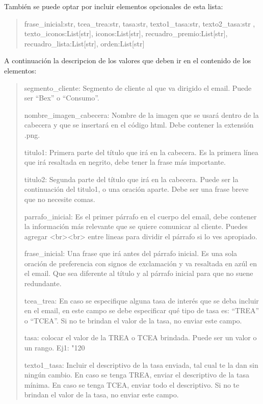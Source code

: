     También se puede optar por incluir elementos opcionales de esta lista:
        \begin{quote} 
        frase\_inicial:str, tcea\_trea:str, tasa:str, texto1\_tasa:str, texto2\_tasa:str , texto\_iconos:List[str], iconos:List[str], recuadro\_premio:List[str], recuadro\_lista:List[str], orden:List[str]
        \end{quote}
    A continuación la descripcion de los valores que deben ir en el contenido de los elementos:
        \begin{quote} 
        segmento\_cliente: Segmento de cliente al que va dirigido el email. Puede ser ``Bex'' o ``Consumo''.
        
        nombre\_imagen\_cabecera: Nombre de la imagen que se usará dentro de la cabecera y que se insertará en el código html. Debe contener la extensión .png.
        
        titulo1: Primera parte del título que irá en la cabecera. Es la primera línea que irá resaltada en negrito, debe tener la frase más importante.
        
        titulo2: Segunda parte del título que irá en la cabecera. Puede ser la continuación del titulo1, o una oración aparte. Debe ser una frase breve que no necesite comas.
        
        parrafo\_inicial: Es el primer párrafo en el cuerpo del email, debe contener la información más relevante que se quiere comunicar al cliente. Puedes agregar <br><br> entre lineas para dividir el párrafo si lo ves apropiado.


        frase\_inicial: Una frase que irá antes del párrafo inicial. Es una sola oración de preferencia con signos de exclamación y va resaltada en azúl en el email. Que sea diferente al título y al párrafo inicial para que no suene redundante.
        
        tcea\_trea: En caso se especifique alguna tasa de interés que se deba incluir en el email, en este campo se debe especificar qué tipo de tasa es: ``TREA'' o ``TCEA''. Si no te brindan el valor de la tasa, no enviar este campo.
        
        tasa: colocar el valor de la TREA o TCEA brindada. Puede ser un valor o un rango. Ej1: "120%
        
        texto1\_tasa: Incluir el descriptivo de la tasa enviada, tal cual te la dan sin ningún cambio. En caso se tenga TREA, enviar el descriptivo de la tasa mínima. En caso se tenga TCEA, enviar todo el descriptivo. Si no te brindan el valor de la tasa, no enviar este campo.
        

\end{quote}
